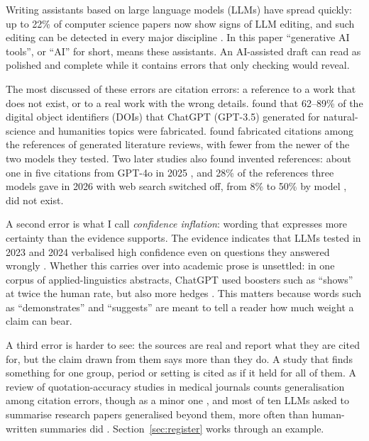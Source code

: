 \documentclass[12pt, a4paper]{article}
\begin{document}
Writing assistants based on large language models (LLMs) have spread
quickly: up to 22\% of computer science papers now show signs of LLM
editing, and such editing can be detected in every major discipline
\citep{liang2025}.  In this paper ``generative AI tools'', or ``AI'' for
short, means these assistants.  An
AI-assisted draft can read as polished and complete while it contains
errors that only checking would reveal.

The most discussed of these errors are citation errors: a reference to
a work that does not exist, or to a real work with the wrong details.
\citet{mugaanyi2024} found that 62--89\% of the digital object
identifiers (DOIs) that ChatGPT (GPT-3.5) generated for natural-science
and humanities topics were fabricated.  \citet{walters2023} found fabricated
citations among the references of generated literature reviews, with
fewer from the newer of the two models they tested.  Two later studies
also found invented references: about one in five citations from GPT-4o in 2025
\citep{linardon2025}, and 28\% of the references three models gave in
2026 with web search switched off, from 8\% to 50\% by model
\citep{seifi2026}, did not exist.

A second error is what I call \emph{confidence
inflation}: wording that expresses more certainty than the evidence
supports.  The evidence indicates that LLMs tested in 2023 and 2024 verbalised
high confidence even on questions they answered wrongly
\citep{xiong2024,zhou2024relying}.
Whether this carries over into academic prose is unsettled: in one
corpus of applied-linguistics abstracts, ChatGPT used boosters such as
``shows'' at twice the human rate, but also more hedges
\citep{eldakhs2025}.  This matters because words such as
``demonstrates'' and ``suggests'' are meant to tell a reader how much
weight a claim can bear.

A third error is harder to see: the sources are real and report what
they are cited for, but the claim drawn from them says more than they
do.  A study that finds something for one group, period or setting is
cited as if it held for all of them.  A review of quotation-accuracy
studies in medical journals counts generalisation among citation errors,
though as a minor one \citep{mogull2017}, and most of ten LLMs asked to
summarise research papers generalised beyond them, more often than
human-written summaries did \citep{peters2025}.  Section~\ref{sec:register} works through an example.
\end{document}
